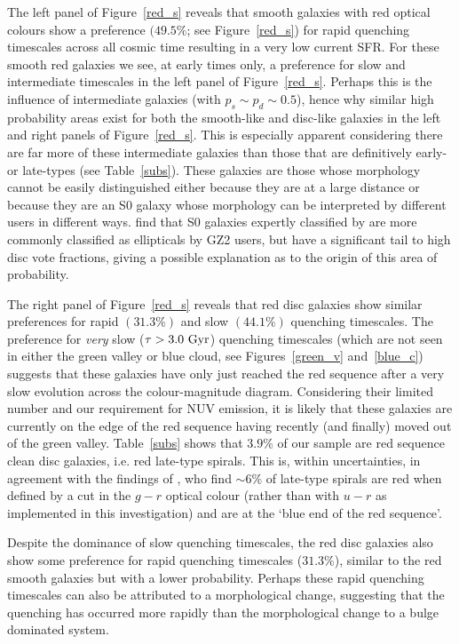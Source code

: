 The left panel of Figure~\ref{red_s} reveals that smooth galaxies with red optical colours show a preference $(49.5\%$; see Figure~\ref{red_s}) for rapid quenching timescales across all cosmic time resulting in a very low current SFR. 
For these smooth red galaxies we see, at early times only, a preference for slow and intermediate timescales in the left panel of Figure~\ref{red_s}. Perhaps this is the influence of intermediate galaxies (with $p_s \sim p_d \sim 0.5$), hence why similar high probability areas exist for both the smooth-like and disc-like galaxies in the left and right panels of Figure~\ref{red_s}. This is especially apparent considering there are far more of these intermediate galaxies than those that are definitively early- or late-types (see Table~\ref{subs}). These galaxies are those whose morphology cannot be easily distinguished either because they are at a large distance or because they are an S0 galaxy whose morphology can be interpreted by different users in different ways. \citet{GZ2} find that S0 galaxies expertly classified by \citet{nair10} are more commonly classified as ellipticals by GZ2 users, but have a significant tail to high disc vote fractions, giving a possible explanation as to the origin of this area of probability.

The right panel of Figure~\ref{red_s} reveals that red disc galaxies show similar preferences for rapid $(31.3\%)$ and slow $(44.1\%)$ quenching timescales. The preference for \emph{very} slow ($\tau > 3.0 ~\rm{Gyr}$) quenching timescales (which are not seen in either the green valley or blue cloud, see Figures~\ref{green_v} and~\ref{blue_c}) suggests that these  galaxies have only just reached the red sequence after a very slow evolution across the colour-magnitude diagram. Considering their limited number and our requirement for NUV emission, it is likely that these galaxies are currently on the edge of the red sequence having recently (and finally) moved out of the green valley. Table~\ref{subs} shows that $3.9\%$ of our sample are red sequence clean disc galaxies, i.e. red late-type spirals. This is, within uncertainties, in agreement with the findings of \citet{masters10c}, who find $\sim6\%$ of late-type spirals are red when defined by a cut in the $g-r$ optical colour (rather than with $u-r$ as implemented in this investigation) and are at the `blue end of the red sequence'. 

Despite the dominance of slow quenching timescales, the red disc galaxies also show some preference for rapid quenching timescales ($31.3\%$), similar to the red smooth galaxies but with a lower probability. Perhaps these rapid quenching timescales can also be attributed to a morphological change, suggesting that the quenching has occurred more rapidly than the morphological change to a bulge dominated system.

